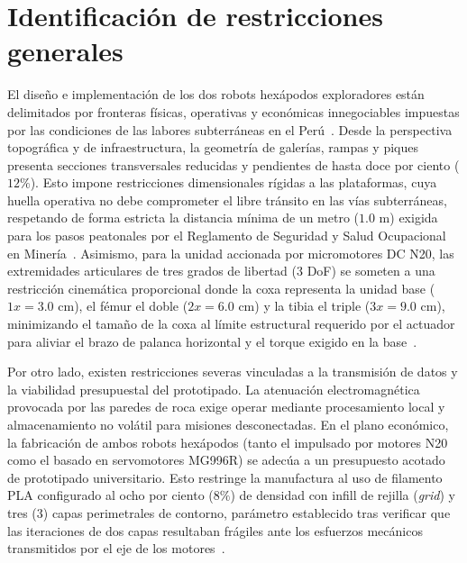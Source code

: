 \section{Identificación de restricciones generales}
\hspace{1.25cm}
El diseño e implementación de los dos robots hexápodos exploradores están delimitados por fronteras físicas, operativas y económicas innegociables impuestas por las condiciones de las labores subterráneas en el Perú~\cite{MINEM_DS024_2016,OSINERGMIN_BoletinGSM_2020}. Desde la perspectiva topográfica y de infraestructura, la geometría de galerías, rampas y piques presenta secciones transversales reducidas y pendientes de hasta doce por ciento ($12\%$). Esto impone restricciones dimensionales rígidas a las plataformas, cuya huella operativa no debe comprometer el libre tránsito en las vías subterráneas, respetando de forma estricta la distancia mínima de un metro ($1.0\text{ m}$) exigida para los pasos peatonales por el Reglamento de Seguridad y Salud Ocupacional en Minería~\cite{MINEM_DS024_2016}. Asimismo, para la unidad accionada por micromotores DC N20, las extremidades articulares de tres grados de libertad (3 DoF) se someten a una restricción cinemática proporcional donde la coxa representa la unidad base ($1x = 3.0\text{ cm}$), el fémur el doble ($2x = 6.0\text{ cm}$) y la tibia el triple ($3x = 9.0\text{ cm}$), minimizando el tamaño de la coxa al límite estructural requerido por el actuador para aliviar el brazo de palanca horizontal y el torque exigido en la base~\cite{InsectInspired_2020}.

\hspace{1.25cm}
Por otro lado, existen restricciones severas vinculadas a la transmisión de datos y la viabilidad presupuestal del prototipado. La atenuación electromagnética provocada por las paredes de roca exige operar mediante procesamiento local y almacenamiento no volátil para misiones desconectadas. En el plano económico, la fabricación de ambos robots hexápodos (tanto el impulsado por motores N20 como el basado en servomotores MG996R) se adecúa a un presupuesto acotado de prototipado universitario. Esto restringe la manufactura al uso de filamento PLA configurado al ocho por ciento ($8\%$) de densidad con infill de rejilla (\textit{grid}) y tres ($3$) capas perimetrales de contorno, parámetro establecido tras verificar que las iteraciones de dos capas resultaban frágiles ante los esfuerzos mecánicos transmitidos por el eje de los motores~\cite{OSINERGMIN_BoletinGSM_2020}.

